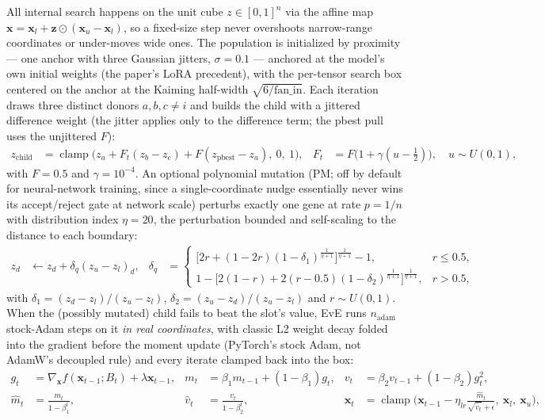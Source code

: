 All internal search happens on the unit cube $z \in [0,1]^n$ via the affine map $\mathbf{x} = \mathbf{x}_l + \mathbf{z} \odot (\mathbf{x}_u - \mathbf{x}_l)$, so a fixed-size step never overshoots narrow-range coordinates or under-moves wide ones. The population is initialized by proximity — one anchor with three Gaussian jitters, $\sigma = 0.1$ — anchored at the model's own initial weights (the paper's LoRA precedent), with the per-tensor search box centered on the anchor at the Kaiming half-width $\sqrt{6/\mathrm{fan\_in}}$. Each iteration draws three distinct donors $a, b, c \ne i$ and builds the child with a jittered difference weight (the jitter applies only to the difference term; the pbest pull uses the unjittered $F$):
\begin{align}
z_{\text{child}} &= \operatorname{clamp}\big(z_a + F_t (z_b - z_c) + F (z_{\text{pbest}} - z_a),\ 0,\ 1\big), &
F_t &= F\big(1 + \gamma (u - \tfrac{1}{2})\big), \quad u \sim U(0,1),
\end{align}
with $F = 0.5$ and $\gamma = 10^{-4}$. An optional polynomial mutation (PM; off by default for neural-network training, since a single-coordinate nudge essentially never wins its accept/reject gate at network scale) perturbs exactly one gene at rate $p = 1/n$ with distribution index $\eta = 20$, the perturbation bounded and self-scaling to the distance to each boundary:
\begin{align}
z_d &\leftarrow z_d + \delta_q (z_u - z_l)_d, &
\delta_q &=
\begin{cases}
\bigl[2r + (1 - 2r)(1 - \delta_1)^{\frac{1}{\eta+1}}\bigr]^{\frac{1}{\eta+1}} - 1, & r \le 0.5,\\[2pt]
1 - \bigl[2(1 - r) + 2(r - 0.5)(1 - \delta_2)^{\frac{1}{\eta+1}}\bigr]^{\frac{1}{\eta+1}}, & r > 0.5,
\end{cases}
\end{align}
with $\delta_1 = (z_d - z_l)/(z_u - z_l)$, $\delta_2 = (z_u - z_d)/(z_u - z_l)$ and $r \sim U(0,1)$. When the (possibly mutated) child fails to beat the slot's value, EvE runs $n_{\text{adam}}$ stock-Adam steps on it \emph{in real coordinates}, with classic L2 weight decay folded into the gradient before the moment update (PyTorch's stock Adam, not AdamW's decoupled rule) and every iterate clamped back into the box:
\begin{align}
g_t &= \nabla_{\mathbf{x}} f(\mathbf{x}_{t-1}; B_t) + \lambda \mathbf{x}_{t-1}, &
m_t &= \beta_1 m_{t-1} + (1 - \beta_1) g_t, &
v_t &= \beta_2 v_{t-1} + (1 - \beta_2) g_t^2, \\
\widehat{m}_t &= \frac{m_t}{1 - \beta_1^t}, &
\widehat{v}_t &= \frac{v_t}{1 - \beta_2^t}, &
\mathbf{x}_t &= \operatorname{clamp}\Big(\mathbf{x}_{t-1} - \eta_{lr} \frac{\widehat{m}_t}{\sqrt{\widehat{v}_t} + \epsilon},\ \mathbf{x}_l,\ \mathbf{x}_u\Big),
\end{align}
